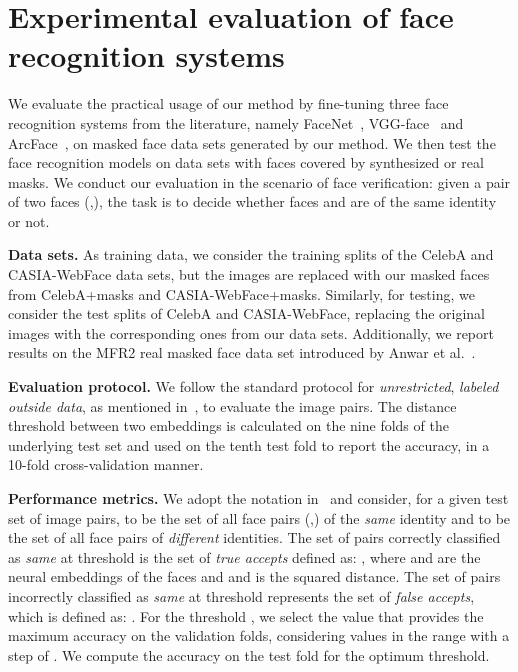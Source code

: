 \documentclass{article}
\begin{document}
\section{Experimental evaluation of face recognition systems}

We evaluate the practical usage of our method by fine-tuning three face recognition systems from the literature, namely FaceNet~\cite{Schroff15CVPR}, VGG-face~\cite{Parkhi15BMVC} and ArcFace~\cite{Deng19CVPR}, on masked face data sets generated by our method.  
We then test the face recognition models on data sets with faces covered by synthesized or real masks. We conduct our evaluation in the scenario of face verification: given a pair of two faces (,), the task is to decide whether faces  and  are of the same identity or not. 

{\bf Data sets.} As training data, we consider the training splits of the CelebA and CASIA-WebFace data sets, but the images are replaced with our masked faces from CelebA+masks and CASIA-WebFace+masks. Similarly, for testing, we consider the test splits of CelebA and CASIA-WebFace, replacing the original images with the corresponding ones from our data sets. Additionally, we report results on the MFR2 real masked face data set introduced by Anwar et al.~\cite{anwar2020arxiv}.

{\bf Evaluation protocol.} We follow the standard protocol for {\emph {unrestricted}}, {\emph{labeled outside data}}, as mentioned in~\cite{Huang07Tech}, to evaluate the image pairs. The  distance threshold between two embeddings is calculated on the nine folds of the underlying test set and used on the tenth test fold to report the accuracy, in a 10-fold cross-validation manner.

{\bf Performance metrics.} We adopt the notation in~\cite{Schroff15CVPR} and consider, for a given test set of image pairs,  to be the set of all face pairs (,) of the {\emph {same}} identity and  to be the set of all face pairs of {\emph {different}} identities. The set of pairs correctly classified as {\emph {same}} at threshold  is the set of {\emph {true accepts}} defined as: , where  and  are the neural embeddings of the faces  and  and  is the squared  distance. The set of pairs incorrectly classified as {\emph {same}} at threshold  represents the set of {\emph {false accepts}}, which is defined as: . For the threshold , we select the value that provides the maximum accuracy on the validation folds, considering values in the range  with a step of . We compute the accuracy on the test fold for the optimum threshold.
\end{document}
